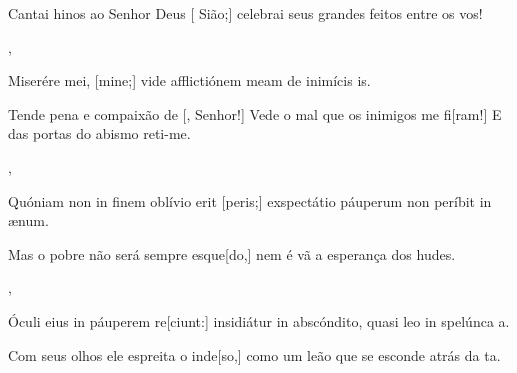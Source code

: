 {        {\item {}Cantai hinos ao Senhor Deus [ Sião;] celebrai seus grandes feitos entre os vos!},
    {\item {}Miserére mei, [mine;] vide afflictiónem meam de inimícis is.}%
        {\item {}Tende pena e compaixão de [, Senhor!] Vede o mal que os inimigos me fi[ram!] E das portas do abismo reti-me.},
    {\item {}Quóniam non in finem oblívio erit [peris;] exspectátio páuperum non períbit in ænum.}%
        {\item {}Mas o pobre não será sempre esque[do,] nem é vã a esperança dos hudes.},
    {\item {}Óculi eius in páuperem re[ciunt:] insidiátur in abscóndito, quasi leo in spelúnca a.}%
        {\item {}Com seus olhos ele espreita o inde[so,] como um leão que se esconde atrás da ta.}
}